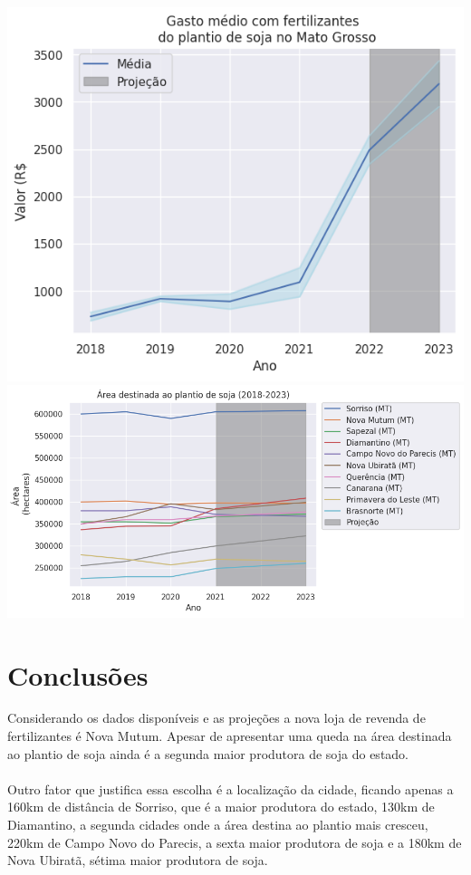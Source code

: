 \documentclass{article}
\begin{document}
\begin{multicols}{2}
\includegraphics[scale=0.4]{proj_fert.png}
\columnbreak
\includegraphics[scale=0.4]{area_plantio_proj.png}
\end{multicols}
\section*{Conclusões}
Considerando os dados disponíveis e as projeções a nova loja de revenda de fertilizantes é Nova Mutum. Apesar de apresentar uma queda na área destinada ao plantio de soja ainda é a segunda maior produtora de soja do estado.
\\~\\
Outro fator que justifica essa escolha é a localização da cidade, ficando apenas a 160km de distância de Sorriso, que é a maior produtora do estado, 130km de Diamantino, a segunda cidades onde a área destina ao plantio mais cresceu, 220km de Campo Novo do Parecis, a sexta maior produtora de soja e a 180km de Nova Ubiratã, sétima maior produtora de soja. 
\end{document}
